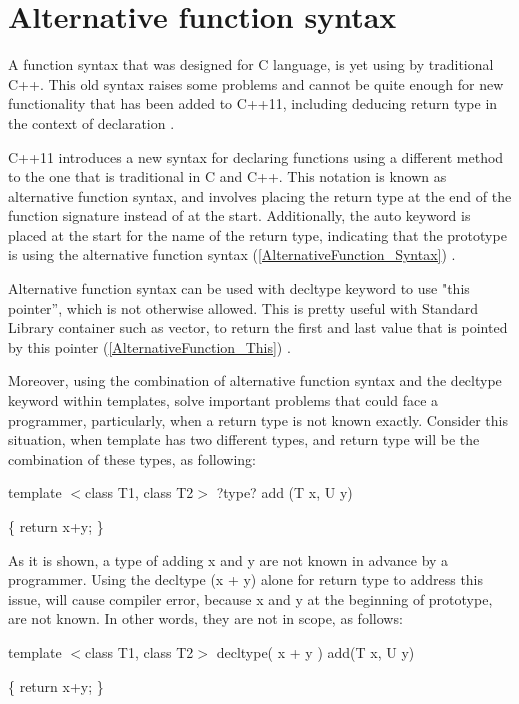 \documentclass[11pt]{report}
\begin{document}
\section{Alternative function syntax}
\label{section: Alternative function syntax}
A function syntax that was designed for C language, is yet using by traditional C++. This old syntax raises some problems and cannot be quite enough for new functionality that has been added to C++11, including deducing return type in the context of declaration \cite{Gregorie:professionalcpp}.


C++11 introduces a new syntax for declaring functions using a different method to the one that is traditional in C and C++. This notation is known as alternative function syntax, and involves placing the return type at the end of the function signature instead of at the start. Additionally, the auto keyword is placed at the start for the name of the return type, indicating that the prototype is using the alternative function syntax (\ref{AlternativeFunction_Syntax}) \cite{Gregorie:professionalcpp}.


Alternative function syntax can be used with decltype keyword to use "this pointer”, which is not otherwise allowed. This is pretty useful with Standard Library container such as vector, to return the first and last value that is pointed by this pointer (\ref{AlternativeFunction_This}) \cite{ISO:2011:Cpplanguage}. 


Moreover, using the combination of alternative function syntax and the decltype keyword within templates, solve important problems that could face a programmer, particularly, when a return type is not known exactly.  Consider this situation, when template has two different types, and return type will be the combination of these types, as following:
\begin{center}
template $<$class T1, class T2$>$  ?type? add (T x, U y) 


\{ return x+y; \}
\end{center}

As it is shown, a type of adding x and y are not known in advance by a programmer. Using the decltype (x + y) alone for return type to address this issue, will cause compiler error, because x and y at the beginning of prototype, are not known.  In other words, they are not in scope, as follows:

\begin{center}
template $<$class T1, class T2$>$  decltype( x + y ) add(T x, U y)


\{ return x+y; \}
\end{center}
\end{document}
